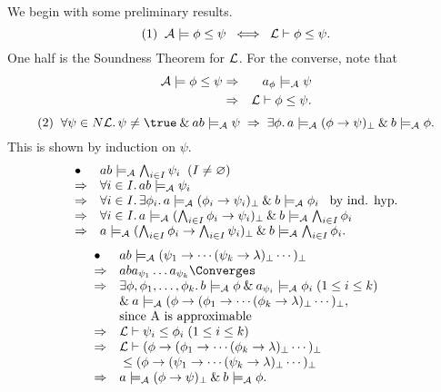 We begin with some preliminary results.
\[ (1) \;\; {\cal A} \models \phi \leq \psi \;\; \Longleftrightarrow \;\; {\cal L} \vdash \phi \leq \psi . \]
One half is the Soundness Theorem for $\cal L$. For the converse, note that
\begin{eqnarray*}
{\cal A} \models \phi \leq \psi & \Rightarrow & a_{\phi} \models_{\cal A} \psi \\
& \Rightarrow & {\cal L} \vdash \phi \leq \psi . 
\end{eqnarray*}
\[ (2) \;\; \forall \psi \in N{\cal L} . \, \psi \neq \true \: \& \: ab \models_{\cal A} \psi \; \Rightarrow \; \exists \phi . \, a \models_{\cal A} (\phi \rightarrow \psi )_{\bot} \: \& \: b \models_{\cal A} \phi . \]
This is shown by induction on $\psi$.
\[ \begin{array}{ll}
\bullet & a b \models_{\cal A} \bigwedge_{i \in I} \psi_{i} \;\; (I \neq \varnothing )  \\
\Rightarrow & \forall i \in I . \, a b \models_{\cal A}  \psi_{i} \\
\Rightarrow & \forall i \in I . \, \exists \phi_{i} . \, a \models_{\cal A} (\phi_{i} \rightarrow \psi_{i})_{\bot} \: \& \: b \models_{\cal A} \phi_{i} \;\;\; \mbox{by ind. hyp.} \\
\Rightarrow & \forall i \in I . \, a \models_{\cal A} (\bigwedge_{i \in I} \phi_{i} \rightarrow \psi_{i})_{\bot} \: \& \: b \models_{\cal A} \bigwedge_{i \in I} \phi_{i} \\
\Rightarrow & a \models_{\cal A} (\bigwedge_{i \in I} \phi_{i} \rightarrow \bigwedge_{i \in I} \psi_{i})_{\bot} \: \& \: b \models_{\cal A} \bigwedge_{i \in I} \phi_{i} .
\end{array} \]
\[ \begin{array}{ll}
\bullet & a b \models_{\cal A} (\psi_{1} \rightarrow \cdots ( \psi_{k} \rightarrow \lambda )_{\bot} \cdots )_{\bot} \\
\Rightarrow & a b a_{\psi_{1}} \ldots a_{\psi_{k}} {\Converges} \\
\Rightarrow & \exists \phi , \phi_{1} , \ldots , \phi_{k} . \, b \models_{\cal A} \phi \: \& \: a_{\psi_{i}} \models_{\cal A} \phi_{i} \; (1 \leq i \leq k) \\ 
& \mbox{} \& \: a \models_{\cal A} (\phi \rightarrow ( \phi_{1} \rightarrow \cdots (\phi_{k} \rightarrow \lambda )_{\bot} \cdots )_{\bot}, \\
& \mbox{since {\cal A} is approximable} \\
\Rightarrow & {\cal L} \vdash \psi_{i} \leq \phi_{i} \; (1 \leq i \leq k) \\
\Rightarrow & {\cal L} \vdash (\phi \rightarrow (\phi_{1} \rightarrow \cdots (\phi_{k} \rightarrow \lambda )_{\bot} \cdots )_{\bot} \\
& \mbox{} \leq (\phi \rightarrow (\psi_{1} \rightarrow \cdots (\psi_{k} \rightarrow \lambda )_{\bot} \cdots )_{\bot} \\
\Rightarrow & a \models_{\cal A} (\phi \rightarrow \psi )_{\bot} \: \& \: b \models_{\cal A} \phi .
\end{array} \]

